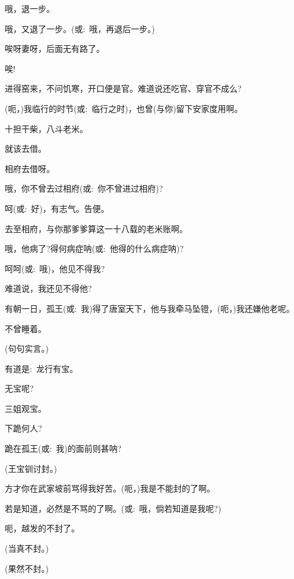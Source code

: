 {{{{哦，退一步。}

{哦，又退了一步。({\akai 或}:~哦，再退后一步。)}

{唉呀妻呀，后面无有路了。}

{唉!}


{ }

{进得窑来，不问饥寒，开口便是官。难道说还吃官、穿官不成么?}

{(呃，)我临行的时节({\akai 或}:~临行之时)，也曾(与你)留下安家度用啊。}

{十担干柴，八斗老米。}

{就该去借。}

{相府去借呀。}

{哦，你不曾去过相府({\akai 或}:~你不曾进过相府)?}

{呵({\akai 或}:~好)，有志气。告便。}

{去至相府，与你那爹爹算这一十八载的老米账啊。}

{哦，他病了?得何病症呐({\akai 或}:~他得的什么病症呐)?}

{呵呵({\akai 或}:~哦)，他见不得我?}

{难道说，我还见不得他?}

{有朝一日，孤王({\akai 或}:~我)得了唐室天下，他与我牵马坠镫，(呃，)我还嫌他老呢。}

{不曾睡着。}

{(句句实言。)}

{有道是:~龙行有宝。}

{无宝呢?}

{三姐观宝。}


{下跪何人?}

{跪在孤王({\akai 或}:~我)的面前则甚呐?}

{(王宝钏\hspace{20pt}讨封。)}

{方才你在武家坡前骂得我好苦。(呃，)我是不能封的了啊。}

{若是知道，必然是不骂的了啊。({\akai 或}:~哦，倘若知道是我呢?)}

{呃，越发的不封了。}

{(当真不封。)}

{(果然不封。)}

}}}
